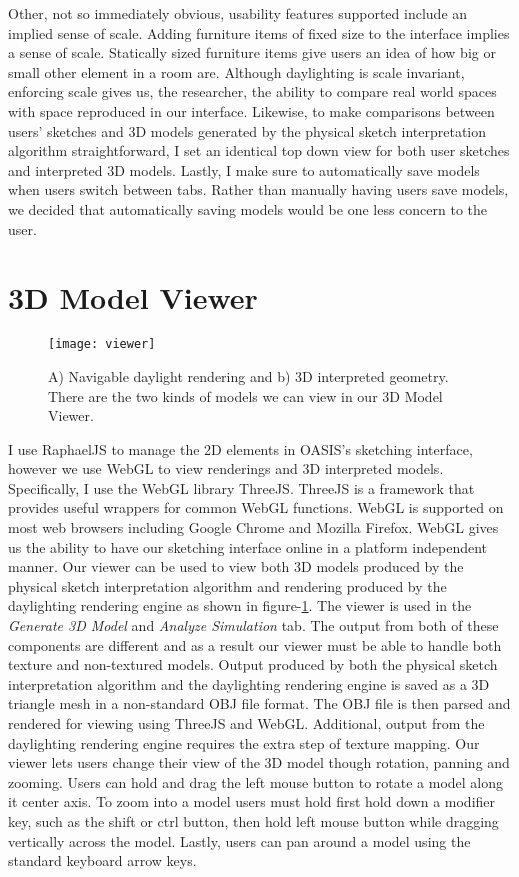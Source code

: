 		Other, not so immediately obvious, usability features supported include an implied sense of scale.
		Adding furniture items of fixed size to the interface implies a sense of scale.
		Statically sized furniture items give users an idea of how big or small other element in a room are.
		Although daylighting is scale invariant, enforcing scale gives us, the researcher, the ability to compare real world spaces with space reproduced in our interface.
		Likewise, to make comparisons between users' sketches and 3D models generated by the physical sketch interpretation algorithm straightforward, I set an identical top down view for both user sketches and interpreted 3D models.
		Lastly, I make sure to automatically save models when users switch between tabs.
		Rather than manually having users save models, we decided that automatically saving models would be one less concern to the user.


\section{3D Model Viewer}

	\begin{figure}[t]
	\centering
	\texttt{[image: viewer]}
	\caption{ A) Navigable daylight rendering and b) 3D interpreted geometry. There are the two kinds of models we can view in our 3D Model Viewer.}
	\label{fig:viewer}
	\end{figure}

	I use RaphaelJS to manage the 2D elements in OASIS's sketching interface, however we use WebGL to view renderings and 3D interpreted models. 
	Specifically, I use the WebGL library ThreeJS\cite{}.
	ThreeJS is a framework that provides useful wrappers for common WebGL functions.
	WebGL is supported on most web browsers including Google Chrome and Mozilla Firefox\cite{}.
	WebGL gives us the ability to have our sketching interface online in a platform independent manner.
	Our viewer can be used to view both 3D models produced by the physical sketch interpretation algorithm and rendering produced by the daylighting rendering engine as shown in figure-\ref{fig:viewer}.
	The viewer is used in the \textit{Generate 3D Model} and \textit{Analyze Simulation} tab.
	The output from both of these components are different and as a result our viewer must be able to handle both texture and non-textured models.
	Output produced by both the physical sketch interpretation algorithm and the daylighting rendering engine is saved as a 3D triangle mesh in a non-standard OBJ file format.
	The OBJ file is then parsed and rendered for viewing using ThreeJS and WebGL.
	Additional, output from the daylighting rendering engine requires the extra step of texture mapping.
	Our viewer lets users change their view of the 3D model though rotation, panning and zooming. 
	Users can hold and drag  the left mouse button to rotate a model along it center axis.
	To zoom into a model users must hold first hold down a modifier key, such as the shift or ctrl button, then hold left mouse button while dragging vertically across the model.
	Lastly, users can pan around a model using the standard keyboard arrow keys.

